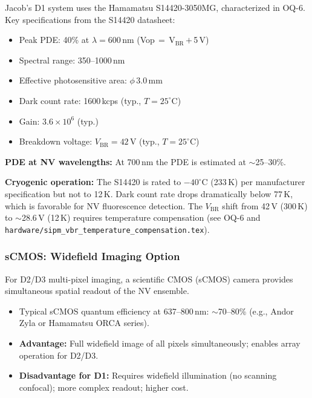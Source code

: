 Jacob's D1 system uses the Hamamatsu S14420-3050MG, characterized in OQ-6.
Key specifications from the S14420 datasheet:\cite{S14420datasheet}
\begin{itemize}
  \item Peak PDE: 40\% at $\lambda = 600$\,nm (Vop\,$=$\,V$_\text{BR}$\,$+$\,5\,V)
    \cite{S14420datasheet}
  \item Spectral range: 350--1000\,nm \cite{S14420datasheet}
  \item Effective photosensitive area: $\phi\,3.0$\,mm \cite{S14420datasheet}
  \item Dark count rate: 1600\,kcps (typ., $T = 25^\circ$C) \cite{S14420datasheet}
  \item Gain: $3.6 \times 10^6$ (typ.) \cite{S14420datasheet}
  \item Breakdown voltage: $V_\text{BR} = 42$\,V (typ., $T = 25^\circ$C)
    \cite{S14420datasheet}
\end{itemize}

\textbf{PDE at NV wavelengths:} At 700\,nm the PDE is estimated at $\sim$25--30\%.\cite{S14420datasheet}

\textbf{Cryogenic operation:} The S14420 is rated to $-40^\circ$C (233\,K)
per manufacturer specification but not to 12\,K.\cite{S14420datasheet}
Dark count rate drops dramatically below 77\,K, which is favorable for
NV fluorescence detection.\cite{SiPMcryoArrays2025}
The $V_\text{BR}$ shift from 42\,V (300\,K) to $\sim$28.6\,V (12\,K)
requires temperature compensation (see OQ-6 and
\texttt{hardware/sipm\_vbr\_temperature\_compensation.tex}).

\subsubsection{sCMOS: Widefield Imaging Option}

For D2/D3 multi-pixel imaging, a scientific CMOS (sCMOS) camera provides
simultaneous spatial readout of the NV ensemble.
\begin{itemize}
  \item Typical sCMOS quantum efficiency at 637--800\,nm: $\sim$70--80\%
    (e.g., Andor Zyla or Hamamatsu ORCA series).
  \item \textbf{Advantage:} Full widefield image of all pixels simultaneously;
    enables array operation for D2/D3.
  \item \textbf{Disadvantage for D1:} Requires widefield illumination (no
    scanning confocal); more complex readout; higher cost.
\end{itemize}

